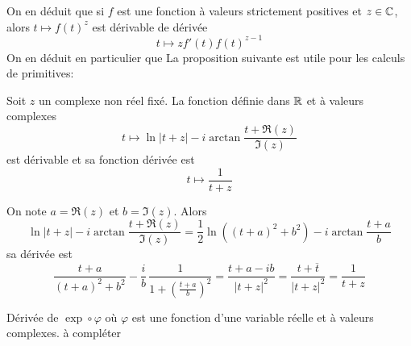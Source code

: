 On en déduit que si $f$ est une fonction à valeurs strictement positives et $z\in \mathbb{C}$, alors $t\mapsto f(t)^z$ est dérivable de dérivée
\begin{displaymath}
  t\mapsto z f'(t)f(t)^{z-1} 
\end{displaymath}
On en déduit en particulier que 
La proposition suivante est utile pour les calculs de primitives:
\begin{prop}
Soit $z$ un complexe non réel fixé. La fonction définie dans $\mathbb{R}$ et à valeurs complexes
\begin{displaymath}
 t\mapsto \ln|t+z|-i\arctan\frac{t+\Re(z)}{\Im(z)}
\end{displaymath}
est dérivable et sa fonction dérivée est
\begin{displaymath}
 t\mapsto \frac{1}{t+z}
\end{displaymath}
\end{prop}
\begin{demo}
  On note $a=\Re(z)$ et $b=\Im(z)$. Alors
\begin{displaymath}
\ln|t+z|-i\arctan\frac{t+\Re(z)}{\Im(z)}
= \frac{1}{2}\ln\left( (t+a)^2+b^2\right) - i \arctan\frac{t+a}{b}
\end{displaymath}
sa dérivée est
\begin{displaymath}
  \frac{t+a}{(t+a)^2+b^2} - \frac{i}{b}\,\frac{1}{1+(\frac{t+a}{b})^2}
  = \frac{t+a-ib}{|t+z|^2}
  = \frac{t + \overline{t}}{|t+z|^2} = \frac{1}{t+z}
\end{displaymath}
\end{demo}

Dérivée de $\exp \circ \varphi$ où $\varphi$ est une fonction d'une variable réelle et à valeurs complexes. à compléter


